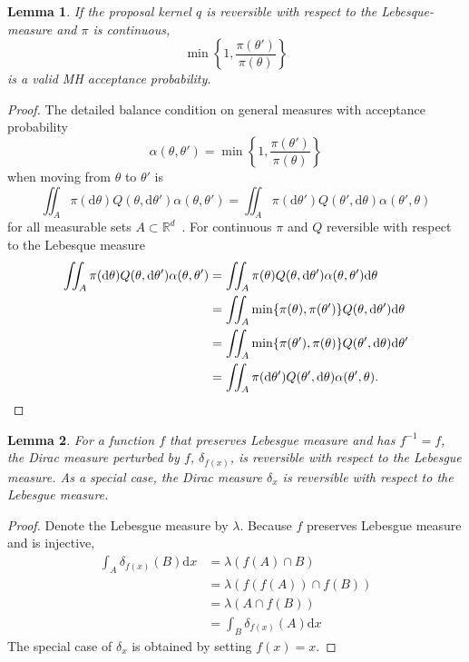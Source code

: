 \documentclass[english,twoside,openright]{HYgraduMLDS}
\newtheorem{lemma}{Lemma}
\newcommand{\R}{\mathbb{R}}
\newcommand{\dx}{\mathrm{d}}
\begin{document}
\begin{lemma}\label{reversible_proposal_lemma}
  If the proposal kernel \(q\) is reversible with respect to the
  Lebesque-measure and \(\pi\) is continuous,
  \[
    \min\left\{1, \frac{\pi(\theta')}{\pi(\theta)}\right\}
  \]
  is a valid MH acceptance probability.
\end{lemma}
\begin{proof}
  The detailed balance condition on general measures
  with acceptance probability
  \[
    \alpha(\theta, \theta') = \min\left\{1, \frac{\pi(\theta')}{\pi(\theta)}\right\}
  \]
  when moving from \(\theta\) to \(\theta'\) is
  \[
    \iint_{A}\pi(\dx \theta)Q(\theta, \dx \theta')\alpha(\theta, \theta')
    = \iint_{A}\pi(\dx \theta')Q(\theta', \dx \theta)\alpha(\theta', \theta)
  \]
  for all measurable sets \(A\subset \R^{d}\)~\cite{Tie98}.
  For continuous \(\pi\) and \(Q\) reversible with respect to the Lebesque measure
  \begin{align*}
    \iint_{A}\pi(\dx \theta)Q(\theta, \dx \theta')\alpha(\theta, \theta')
    &= \iint_{A}\pi(\theta)Q(\theta, \dx \theta')\alpha(\theta, \theta')\dx\theta
    \\&= \iint_{A}\min\{\pi(\theta), \pi(\theta')\}Q(\theta, \dx \theta')\dx\theta
    \\&= \iint_{A}\min\{\pi(\theta'), \pi(\theta)\}Q(\theta', \dx \theta)\dx\theta'
    \\&= \iint_{A}\pi(\dx \theta')Q(\theta', \dx \theta)\alpha(\theta', \theta).
    \qedhere
  \end{align*}
\end{proof}

\begin{lemma}\label{dirac_measure_reversible_lemma}
  For a function \(f\) that preserves Lebesgue measure and has
  \(f^{-1} = f\),
	the Dirac measure perturbed by \(f\), \(\delta_{f(x)}\), is reversible
  with respect to the Lebesgue measure. As a special case,
  the Dirac measure \(\delta_{x}\) is reversible with respect to the
  Lebesgue measure.
\end{lemma}
\begin{proof}
  Denote the Lebesgue measure by \(\lambda\). Because \(f\) preserves
  Lebesgue measure and is injective,
	\begin{align*}
    \int_{A}\delta_{f(x)}(B)\dx x
    &= \lambda(f(A)\cap B)
    \\&= \lambda(f(f(A))\cap f(B))
    \\&= \lambda(A\cap f(B))
    \\&= \int_{B}\delta_{f(x)}(A)\dx x
  \end{align*}
  The special case of \(\delta_{x}\) is obtained by setting \(f(x) = x\).
\end{proof}
\end{document}

